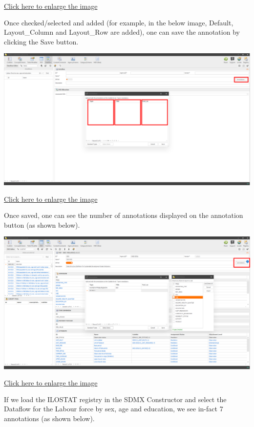 \documentclass[
]{book}
\begin{document}
\href{images/image2.png}{Click here to enlarge the image}

Once checked/selected and added (for example, in the below image, Default, Layout\_Column and Layout\_Row are added), one can save the annotation by clicking the Save button.

\begin{center}\includegraphics[width=1\linewidth]{./images/image3} \end{center}

\href{images/image3.png}{Click here to enlarge the image}

Once saved, one can see the number of annotations displayed on the annotation button (as shown below).

\begin{center}\includegraphics[width=1\linewidth]{./images/image4} \end{center}

\href{images/image4.png}{Click here to enlarge the image}

If we load the ILOSTAT registry in the SDMX Constructor and select the Dataflow for the Labour force by sex, age and education, we see in-fact 7 annotations (as shown below).
\end{document}
